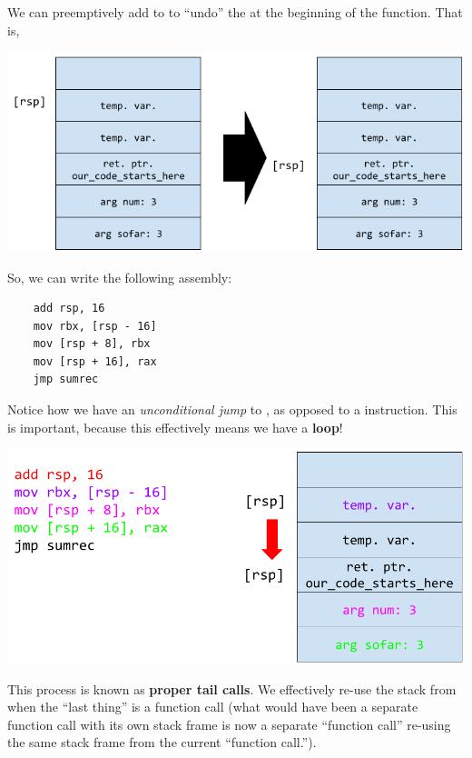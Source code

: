 \documentclass[letterpaper]{article}
\begin{document}
We can preemptively add to  to ``undo'' the  at the beginning of the function. That is, 
\begin{center}
    \includegraphics[scale=0.5]{../assets/tail_call_2.png}
\end{center}
So, we can write the following assembly:
\begin{verbatim}
    add rsp, 16 
    mov rbx, [rsp - 16]
    mov [rsp + 8], rbx 
    mov [rsp + 16], rax 
    jmp sumrec\end{verbatim}
Notice how we have an \emph{unconditional jump} to , as opposed to a  instruction. This is important, because this effectively means we have a \textbf{loop}!
\begin{center}
    \includegraphics[scale=0.4]{../assets/tail_call_3.png}
\end{center}
This process is known as \textbf{proper tail calls}. We effectively re-use the stack from when the ``last thing'' is a function call (what would have been a separate function call with its own stack frame is now a separate ``function call'' re-using the same stack frame from the current ``function call.'').
\end{document}
